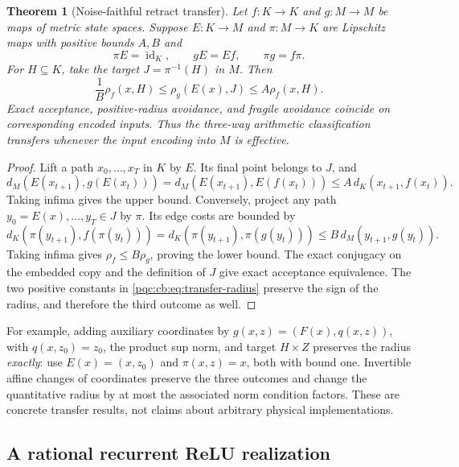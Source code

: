 \documentclass[11pt,letterpaper]{article}
\numberwithin{equation}{section}
\newtheorem{theorem}{Theorem}[section]
\theoremstyle{definition}
\theoremstyle{remark}
\begin{document}
\begin{theorem}[Noise-faithful retract transfer]
\label{pqc:cb:thm:transfer}
Let $f:K\to K$ and $g:M\to M$ be maps of metric state spaces.  Suppose
$E:K\to M$ and $\pi:M\to K$ are Lipschitz maps with positive bounds $A,B$ and
\begin{equation}
 \pi E=\operatorname{id}_K,\qquad gE=Ef,\qquad \pi g=f\pi.
 \label{pqc:cb:eq:retract}
\end{equation}
For $H\subseteq K$, take the target $J=\pi^{-1}(H)$ in $M$.  Then
\begin{equation}
 \frac1B\rho_f(x,H)\le\rho_g(E(x),J)\le A\rho_f(x,H).
 \label{pqc:cb:eq:transfer-radius}
\end{equation}
Exact acceptance, positive-radius avoidance, and fragile avoidance coincide
on corresponding encoded inputs.  Thus the three-way arithmetic
classification transfers whenever the input encoding into $M$ is effective.
\end{theorem}
\begin{proof}
Lift a path $x_0,\ldots,x_T$ in $K$ by $E$.  Its final point belongs to $J$, and
\[
 d_M(E(x_{t+1}),g(E(x_t)))
 =d_M(E(x_{t+1}),E(f(x_t)))\le A\,d_K(x_{t+1},f(x_t)).
\]
Taking infima gives the upper bound.  Conversely, project any path
$y_0=E(x),\ldots,y_T\in J$ by $\pi$.  Its edge costs are bounded by
\[
 d_K(\pi(y_{t+1}),f(\pi(y_t)))
 =d_K(\pi(y_{t+1}),\pi(g(y_t)))\le B\,d_M(y_{t+1},g(y_t)).
\]
Taking infima gives $\rho_f\le B\rho_g$, proving the lower bound.
The exact conjugacy on the embedded copy and the definition of $J$ give
exact acceptance equivalence.  The two positive constants in
\eqref{pqc:cb:eq:transfer-radius} preserve the sign of the radius, and therefore the
third outcome as well.
\end{proof}

For example, adding auxiliary coordinates by
$g(x,z)=(F(x),q(x,z))$, with $q(x,z_0)=z_0$, the product sup norm, and target
$H\times Z$ preserves the radius \emph{exactly}: use $E(x)=(x,z_0)$ and
$\pi(x,z)=x$, both with bound one.  Invertible affine changes of coordinates
preserve the three outcomes and change the quantitative radius by at most
the associated norm condition factors.  These are concrete transfer results,
not claims about arbitrary physical implementations.

\subsection{A rational recurrent ReLU realization}
\end{document}
